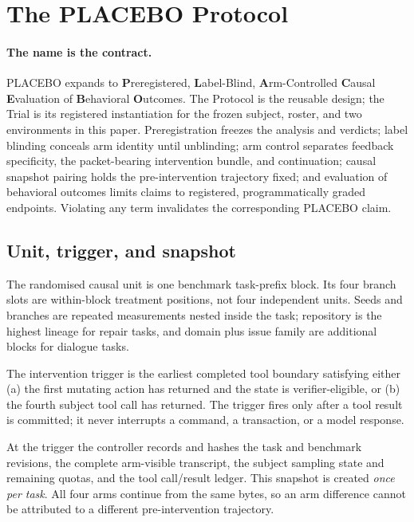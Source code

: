 \documentclass{article}
\newcommand{\placeboexpanded}{%
    \textbf{P}reregistered, \textbf{L}abel-Blind, \textbf{A}rm-Controlled
    \textbf{C}ausal \textbf{E}valuation of \textbf{B}ehavioral \textbf{O}utcomes}
\begin{document}
\section{The PLACEBO Protocol}
\label{sec:protocol}

\paragraph{The name is the contract.}
PLACEBO expands to \placeboexpanded. The Protocol is the reusable design; the
Trial is its registered instantiation for the frozen subject, roster, and two
environments in this paper. Preregistration freezes the analysis and verdicts;
label blinding conceals arm identity until unblinding; arm control separates
feedback specificity, the packet-bearing intervention bundle, and continuation;
causal snapshot pairing holds the
pre-intervention trajectory fixed; and evaluation of behavioral outcomes limits
claims to registered, programmatically graded endpoints. Violating any term
invalidates the corresponding PLACEBO claim.

\subsection{Unit, trigger, and snapshot}

The randomised causal unit is one benchmark task-prefix block. Its four branch
slots are within-block treatment positions, not four independent units. Seeds
and branches are repeated measurements nested inside the task; repository is the highest
lineage for repair tasks, and domain plus issue family are additional blocks
for dialogue tasks.

The intervention trigger is the earliest completed tool boundary satisfying
either (a) the first mutating action has returned and the state is
verifier-eligible, or (b) the fourth subject tool call has returned. The
trigger fires only after a tool result is committed; it never interrupts a
command, a transaction, or a model response.

At the trigger the controller records and hashes the task and benchmark
revisions, the complete arm-visible transcript, the subject sampling state and
remaining quotas, and the tool call/result ledger. This snapshot is created
\emph{once per task}. All four arms continue from the same bytes, so an arm
difference cannot be attributed to a different pre-intervention trajectory.
\end{document}
